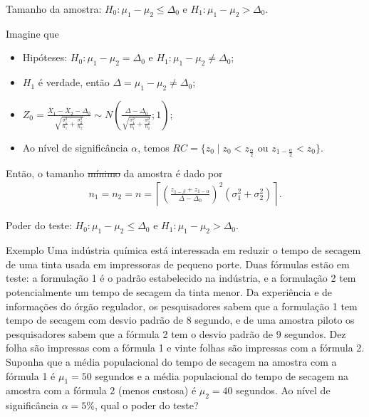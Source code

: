\documentclass[9pt]{beamer}
\begin{document}
\begin{frame}{Tamanho da amostra: $H_0:\mu_1 - \mu_2 \leq \Delta_0$ e $H_1: \mu_1 - \mu_2 > \Delta_0$.}

\large

Imagine que
\begin{itemize}
\item Hipóteses: $H_0: \mu_1 - \mu_2 = \Delta_0$ e $H_1: \mu_1 -  \mu_2 \neq \Delta_0$;
\item $H_1$ é verdade, então $\Delta = \mu_1-\mu_2 \neq \Delta_0$;
\item $Z_0 = \frac{\bar{X}_1 - \bar{X}_2 - \Delta_0}{ \sqrt{ \frac{\sigma_1^2}{n_1} + \frac{\sigma_2^2}{n_2} } } \sim N\left( \frac{\Delta - \Delta_0}{ \sqrt{ \frac{\sigma_1^2}{n_1} + \frac{\sigma_2^2}{n_2} } } ; 1\right)$;
\item Ao nível de significância $\alpha$, temos $RC = \{ z_0 \mid z_0 < z_{\frac{\alpha}{2}} \mbox{ ou } z_{1-\frac{\alpha}{2}} < z_0  \}$.
\end{itemize}
\vfill


Então, o tamanho \sout{mínimo} da amostra é dado por
\begin{align*}
n_1 = n_2 = n = \left\lceil \left( \frac{z_{1-\beta} + z_{1-\alpha}}{\Delta - \Delta_0} \right)^2 (\sigma_1^2 + \sigma_2^2) \right\rceil.
\end{align*}

\normalsize

\end{frame}

\begin{frame}{Poder do teste: $H_0:\mu_1 - \mu_2 \leq \Delta_0$ e $H_1: \mu_1 - \mu_2 > \Delta_0$.}

\begin{block}{Exemplo}
	Uma indústria química está interessada em reduzir o tempo de secagem de uma tinta usada em impressoras de pequeno porte. Duas fórmulas estão em teste: a formulação 1 é o padrão estabelecido na indústria, e a formulação 2 tem potencialmente um tempo de secagem da tinta menor. Da experiência e de informações do órgão regulador, os pesquisadores sabem que a formulação 1 tem tempo de secagem com desvio padrão de 8 segundo, e de uma amostra piloto os pesquisadores sabem que a fórmula 2 tem o desvio padrão de 9 segundos. Dez folha são impressas com a fórmula 1 e vinte folhas são impressas com a fórmula 2. Suponha que a média populacional do tempo de secagem na amostra com a fórmula 1 é $\mu_1 = 50$ segundos e a média populacional do tempo de secagem na amostra com a fórmula 2 (menos custosa) é $\mu_2 = 40$ segundos. Ao nível de significância $\alpha=5\%$, qual o poder do teste?
\end{block}

\end{frame}
\end{document}
